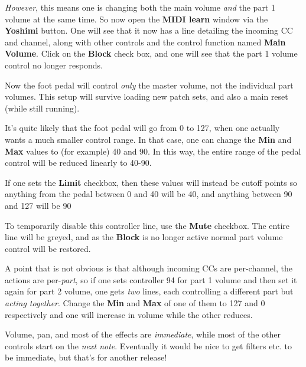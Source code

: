    \textsl{However}, this means one is changing both the main volume
   \textsl{and} the part 1 volume at the same time.  So now open the
   \textbf{MIDI learn} window via the \textbf{Yoshimi} button. One will
   see that it now has a line detailing the incoming CC and channel, along with
   other controls and the control function named \textbf{Main Volume}.  Click
   on the \textbf{Block} check box, and one will see that the part 1 volume
   control no longer responds.

   Now the foot pedal will control \textsl{only} the master volume, not the
   individual part volumes. This setup will survive loading new patch sets, and
   also a main reset (while still running).

   It's quite likely that the foot pedal will go from 0 to 127, when one actually
   wants a much smaller control range.  In that case, one can change the
   \textbf{Min} and \textbf{Max}
   values to (for example) 40 and 90.
   In this way, the entire range of the pedal control will be reduced linearly to
   40-90.

   If one sets the \textbf{Limit} checkbox, then these values will instead be
   cutoff points so anything from the pedal between 0 and 40 will be 40, and
   anything between 90 and 127 will be 90

   To temporarily disable this controller line, use the \textbf{Mute} checkbox.
   The entire line will be greyed, and as the \textbf{Block} is no longer
   active normal part volume control will be restored.

   A point that is not obvious is that although incoming CCs are per-channel,
   the actions are per-\textsl{part}, so if one sets controller 94 for part 1
   volume and then set it again for part 2 volume, one gets \textsl{two} lines,
   each controlling a different part but \textsl{acting together}.  Change the
   \textbf{Min} and \textbf{Max} of one of them to 127 and 0 respectively and
   one will increase in volume while the other reduces.

   Volume, pan, and most of the effects are \textsl{immediate}, while most of
   the other controls start on the \textsl{next note}.  Eventually it would be
   nice to get filters etc. to be immediate, but that's for another release!

